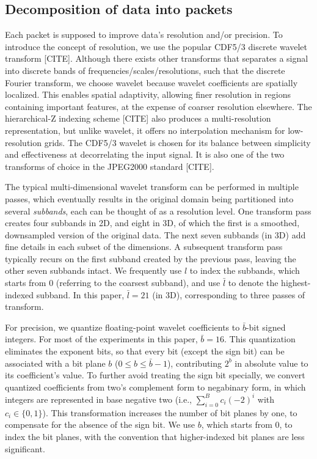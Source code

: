 \subsection{Decomposition of data into packets}
\label{sec:data-streaming-framework}
Each packet is supposed to improve data's resolution and/or precision. To introduce the concept of
resolution, we use the popular CDF5/3 discrete wavelet transform [CITE]. Although there exists other
transforms that separates a signal into discrete bands of frequencies/scales/resolutions, such that
the discrete Fourier transform, we choose wavelet because wavelet coefficients are spatially
localized. This enables spatial adaptivity, allowing finer resolution in regions containing
important features, at the expense of coarser resolution elsewhere. The hierarchical-Z indexing
scheme [CITE] also produces a multi-resolution representation, but unlike wavelet, it offers no
interpolation mechanism for low-resolution grids. The CDF5/3 wavelet is chosen for its balance
between simplicity and effectiveness at decorrelating the input signal. It is also one of the two
transforms of choice in the JPEG2000 standard [CITE].

The typical multi-dimensional wavelet transform can be performed in multiple passes, which
eventually results in the original domain being partitioned into several \emph{subbands}, each can
be thought of as a resolution level. One transform pass creates four subbands in 2D, and eight in
3D, of which the first is a smoothed, downsampled version of the original data. The next seven
subbands (in 3D) add fine details in each subset of the dimensions. A subsequent transform pass
typically recurs on the first subband created by the previous pass, leaving the other seven subbands
intact. We frequently use $l$ to index the subbands, which starts from 0 (referring to the coarsest
subband), and use $\bar{l}$ to denote the highest-indexed subband. In this paper, $\bar{l}=21$ (in
3D), corresponding to three passes of transform.

For precision, we quantize floating-point wavelet coefficients to $\bar{b}$-bit signed integers. For
most of the experiments in this paper, $\bar{b}=16$. This quantization eliminates the exponent bits,
so that every bit (except the sign bit) can be associated with a bit plane $b$ ($0\leq b\leq
\bar{b}-1$), contributing $2^b$ in absolute value to its coefficient's value. To further avoid
treating the sign bit specially, we convert quantized coefficients from two's complement form to
negabinary form, in which integers are represented in base negative two (i.e.,
$\sum_{i=0}^{B}{c_i(-2)^i}$ with $c_i\in \{0,1\}$). This transformation increases the number of bit
planes by one, to compensate for the absence of the sign bit. We use $b$, which starts from 0, to
index the bit planes, with the convention that higher-indexed bit planes are less significant.

